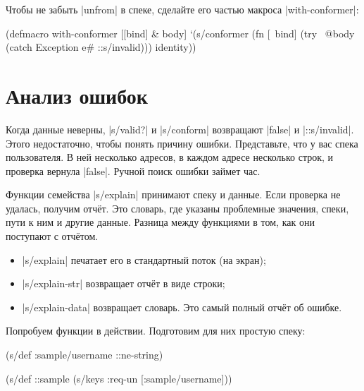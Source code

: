 Чтобы не забыть \spverb|unfrom| в спеке, сделайте его частью макроса
\spverb|with-conformer|:

\begin{english}
  \begin{clojure}
(defmacro with-conformer
  [[bind] & body]
  `(s/conformer
    (fn [~bind]
      (try
        ~@body
        (catch Exception e#
          ::s/invalid)))
    identity))
  \end{clojure}
\end{english}

\section{Анализ ошибок}


\label{spec-explain}

Когда данные неверны, \spverb|s/valid?| и \spverb|s/conform| возвращают
\spverb|false| и \spverb|::s/invalid|. Этого недостаточно, чтобы понять причину
ошибки. Представьте, что у вас спека пользователя. В ней несколько адресов, в
каждом адресе несколько строк, и проверка вернула \spverb|false|. Ручной поиск
ошибки займет час.

Функции семейства \spverb|s/explain| принимают спеку и данные. Если проверка не
удалась, получим отч\"{е}т. Это словарь, где указаны проблемные значения, спеки,
пути к ним и другие данные. Разница между функциями в том, как они поступают с
отч\"{е}том.

\begin{itemize}


\item
  \spverb|s/explain| печатает его в стандартный поток (на экран);

\item
  \spverb|s/explain-str| возвращает отч\"{е}т в виде строки;

\item
  \spverb|s/explain-data| возвращает словарь. Это самый полный отч\"{е}т об ошибке.

\end{itemize}

Попробуем функции в действии. Подготовим для них простую спеку:

\begin{english}
  \begin{clojure}
(s/def :sample/username ::ne-string)

(s/def ::sample
  (s/keys :req-un [:sample/username]))
  \end{clojure}
\end{english}

